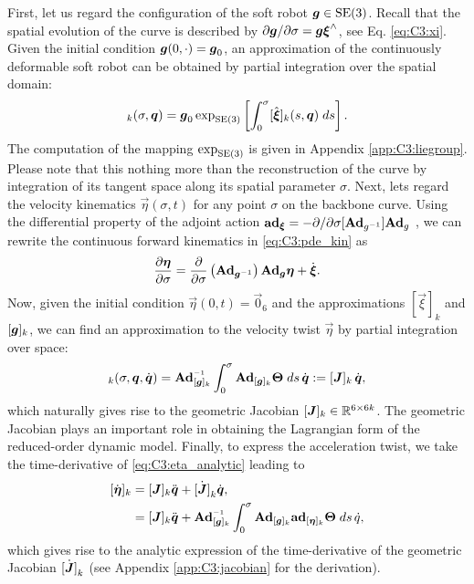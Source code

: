 First, let us regard the configuration of the soft robot $\boldsymbol{g} \in \textup{\textrm{SE}}(3)$. Recall that the spatial evolution of the curve is described by $\partial \boldsymbol{g}/\partial\sigma = \boldsymbol{g} \boldsymbol{\xi}^\wedge$, see Eq. \eqref{eq:C3:xi}. Given the initial condition $\boldsymbol{g}(0,\cdot) = \boldsymbol{g}_0$, an approximation of the continuously deformable soft robot can be obtained by partial integration over the spatial domain:
%
\vspace{-2mm}
\begin{equation}
[\mat{g}]_k(\sigma,\vec{q}) = \mat{g}_0 \exp_{\SE{3}}\left[\int_0^\sigma [\hat{\vec{\xi}}]_k(s,\vec{q}) \; ds \right].
\end{equation}
%
The computation of the mapping $\exp_{\textup{\textrm{SE}}(3)}$ is given in Appendix \ref{app:C3:liegroup}. Please note that this nothing more than the reconstruction of the curve by integration of its tangent space along its spatial parameter $\sigma$. Next, lets regard the velocity kinematics $\vec{\eta}(\sigma,t)$ for any point $\sigma$ on the backbone curve. Using the differential property of the adjoint action $\boldsymbol{\textbf{ad}}_{\boldsymbol{\xi}} = -\partial /\partial \sigma [\textbf{Ad}_{g^{-1}}] \textbf{Ad}_{g}$ \cite{Murray1994}, we can rewrite the continuous forward kinematics in \eqref{eq:C3:pde_kin} as
%
\begin{equation}
\frac{\partial \boldsymbol{\eta}}{\partial \sigma } = \frac{\partial }{\partial \sigma }\left(\boldsymbol{\textbf{Ad}}_{\boldsymbol{g}^{-1}}\right) \boldsymbol{\textbf{Ad}}_{\boldsymbol{g}} \boldsymbol{\eta} + \dot{\boldsymbol{\xi}}. \label{eq:eta_adg}
\end{equation}
%
Now, given the initial condition $\vec{\eta}(0,t) = \vec{0}_6$ and the approximations $[\vec{\xi}]_k$ and $[\boldsymbol{g}]_k$, we can find an approximation to the velocity twist $\vec{\eta}$ by partial integration over space:
%
\begin{equation}
[\vec{\eta}]_k(\sigma,\vec{q},\dot{\vec{q}}) = \Ad_{[\mat{g}]_k}\inv \int_0^\sigma \Ad_{[\mat{g}]_k} \mat{\Theta} \; ds \,\dot{\vec{q}} := [\mat{J}]_k\, \dot{\vec{q}}, \label{eq:C3:eta_analytic}
\end{equation}
%
which naturally gives rise to the geometric Jacobian $[\boldsymbol{J}]_k \in \mathbb{R}^{6\times 6k}$. The geometric Jacobian plays an important role in obtaining the Lagrangian form of the reduced-order dynamic model. Finally, to express the acceleration twist, we take the time-derivative of \eqref{eq:C3:eta_analytic} leading to
%
\begin{align}{}
[\dot{\vec{\eta}}]_k & = [\mat{J}]_k\ddot{\vec{q}} + \dot{[\mat{J}]}_k\dot{\vec{q}}, \notag \\
& = [\mat{J}]_k\ddot{\vec{q}} + \Ad_{[\mat{g}]_k}\inv \int_0^\sigma \Ad_{[\mat{g}]_k} \ad_{[\vec{\eta}]_k} \mat{\Theta} \; ds \,\dot{q} \label{eq:C3:deta_analytic},
\end{align}
%
which gives rise to the analytic expression of the time-derivative of the geometric Jacobian $\dot{[\boldsymbol{J}]}_k$ (see Appendix \ref{app:C3:jacobian} for the derivation).

